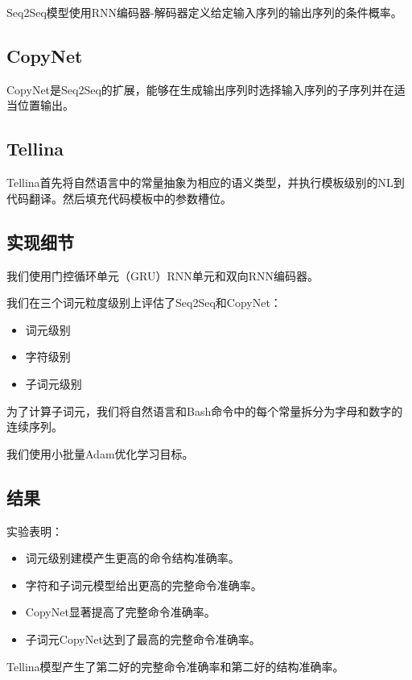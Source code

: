 Seq2Seq模型使用RNN编码器-解码器定义给定输入序列的输出序列的条件概率。

\subsection{CopyNet}

CopyNet是Seq2Seq的扩展，能够在生成输出序列时选择输入序列的子序列并在适当位置输出。

\subsection{Tellina}

Tellina首先将自然语言中的常量抽象为相应的语义类型，并执行模板级别的NL到代码翻译。然后填充代码模板中的参数槽位。

\subsection{实现细节}

我们使用门控循环单元（GRU）RNN单元和双向RNN编码器。

我们在三个词元粒度级别上评估了Seq2Seq和CopyNet：

\begin{itemize}
    \item 词元级别
    \item 字符级别
    \item 子词元级别
\end{itemize}

为了计算子词元，我们将自然语言和Bash命令中的每个常量拆分为字母和数字的连续序列。

我们使用小批量Adam优化学习目标。

\subsection{结果}

实验表明：

\begin{itemize}
    \item 词元级别建模产生更高的命令结构准确率。
    \item 字符和子词元模型给出更高的完整命令准确率。
    \item CopyNet显著提高了完整命令准确率。
    \item 子词元CopyNet达到了最高的完整命令准确率。
\end{itemize}

Tellina模型产生了第二好的完整命令准确率和第二好的结构准确率。

